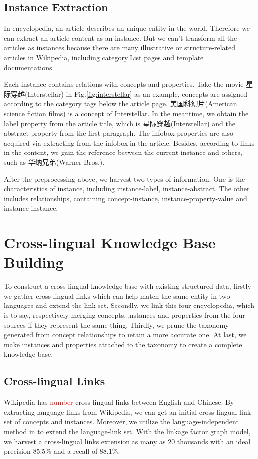 \documentclass[runningheads,a4paper]{llncs}
\begin{document}
\subsection{Instance Extraction}
\label{sec:ie}
In encyclopedia, an article describes an unique entity in the world. Therefore we can extract an article content as an instance. But we can't transform all the articles as instances because there are many illustrative or structure-related articles in Wikipedia, including category List pages and template documentations.

Each instance contains relations with concepts and properties. Take the movie 星际穿越(Interstellar) in Fig.\ref{fig:interstellar} as an example, concepts are assigned according to the category tags below the article page. 美国科幻片(American science fiction films) is a concept of Interstellar. In the meantime, we obtain the label property from the article title, which is 星际穿越(Interstellar) and the abstract property from the first paragraph. The infobox-properties are also acquired via extracting from the infobox in the article. Besides, according to links in the content, we gain the reference between the current instance and others, such as 华纳兄弟(Warner Bros.).

After the preprocessing above, we harvest two types of information. One is the characteristics of instance, including instance-label, instance-abstract. The other includes relationships, containing concept-instance, instance-property-value and instance-instance.

\section{Cross-lingual Knowledge Base Building}
\label{sec:clkbb}
To construct a cross-lingual knowledge base with existing structured data, firstly we gather cross-lingual links which can help match the same entity in two languages and extend the link set. Secondly, we link this four encyclopedia, which is to say, respectively merging concepts, instances and properties from the four sources if they represent the same thing. Thirdly, we prune the taxonomy generated from concept relationships to retain a more accurate one. At last, we make instances and properties attached to the taxonomy to create a complete knowledge base.

\subsection{Cross-lingual Links}
Wikipedia has \textcolor{red}{number} cross-lingual links between English and Chinese. By extracting language links from Wikipedia, we can get an initial cross-lingual link set of concepts and instances. Moreover, we utilize the language-independent method in \cite{wang2012cross} to extend the language-link set. With the linkage factor graph model, we harvest a cross-lingual links extension as many as 20 thousands with an ideal precision 85.5\% and a recall of 88.1\%.
\end{document}
